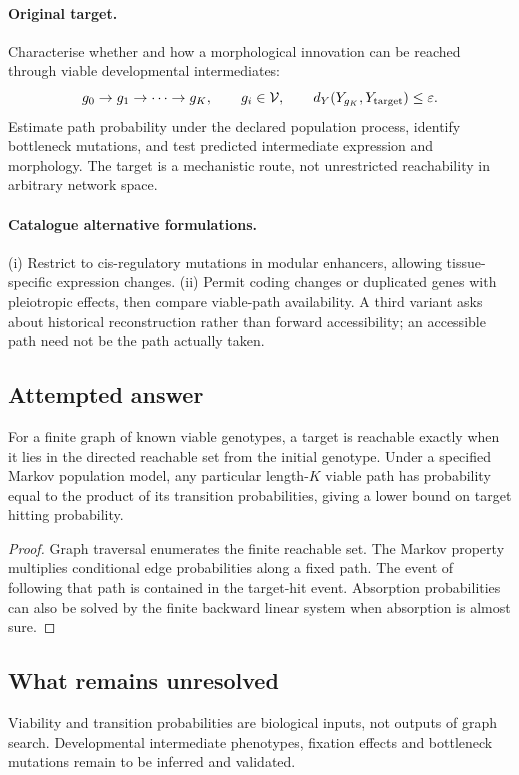 \documentclass[11pt]{article}
\begin{document}
\paragraph{Original target.}
Characterise whether and how a morphological innovation can be reached through viable developmental intermediates:
\[
 g_0\to g_1\to\cdots\to g_K,
\qquad g_i\in\mathcal V,
\qquad d_Y(Y_{g_K},Y_{\rm target})\leq\varepsilon.
\]
Estimate path probability under the declared population process, identify bottleneck mutations, and test predicted intermediate expression and morphology. The target is a mechanistic route, not unrestricted reachability in arbitrary network space.
\paragraph{Catalogue alternative formulations.}
(i) Restrict to cis-regulatory mutations in modular enhancers, allowing tissue-specific expression changes. (ii) Permit coding changes or duplicated genes with pleiotropic effects, then compare viable-path availability. A third variant asks about historical reconstruction rather than forward accessibility; an accessible path need not be the path actually taken.
\subsection{Attempted answer}
\begin{proposition}
For a finite graph of known viable genotypes, a target is reachable exactly when it lies in the directed reachable set from the initial genotype. Under a specified Markov population model, any particular length-$K$ viable path has probability equal to the product of its transition probabilities, giving a lower bound on target hitting probability.
\end{proposition}
\begin{proof}
Graph traversal enumerates the finite reachable set. The Markov property multiplies conditional edge probabilities along a fixed path. The event of following that path is contained in the target-hit event. Absorption probabilities can also be solved by the finite backward linear system when absorption is almost sure.
\end{proof}
\subsection{What remains unresolved}
Viability and transition probabilities are biological inputs, not outputs of graph search. Developmental intermediate phenotypes, fixation effects and bottleneck mutations remain to be inferred and validated.
\end{document}
